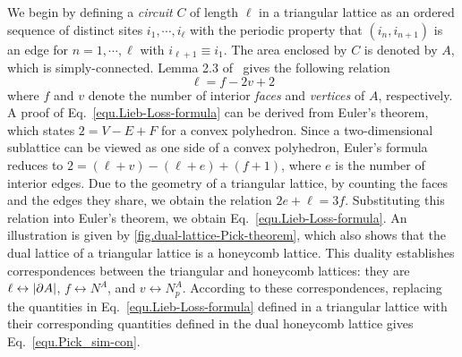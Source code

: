 We begin by defining a \textit{circuit} $C$ of length $\ell$ in a triangular lattice as an ordered sequence of distinct sites $i_1,\cdots, i_\ell$ with the periodic property that $(i_n, i_{n+1})$ is an edge for $n = 1, \cdots, \ell$ with $i_{\ell+1} \equiv i_1$. The area enclosed by $C$ is denoted by $A$, which is simply-connected. Lemma 2.3 of~\cite{Lieb-Loss_1992} gives the following relation
\begin{equation}\label{equ.Lieb-Loss-formula}
    \ell = f - 2v + 2
\end{equation}
where $f$ and $v$ denote the number of interior \textit{faces} and \textit{vertices} of $A$, respectively. A proof of Eq.~\eqref{equ.Lieb-Loss-formula} can be derived from Euler's theorem, which states $2 = V-E+F$ for a convex polyhedron. Since a two-dimensional sublattice can be viewed as one side of a convex polyhedron, Euler's formula reduces to $2 = (\ell + v) - (\ell + e) + (f+1)$, where $e$ is the number of interior edges. Due to the geometry of a triangular lattice, by counting the faces and the edges they share, we obtain the relation $2e+\ell = 3f$. Substituting this relation into Euler's theorem, we obtain Eq.~\eqref{equ.Lieb-Loss-formula}. An illustration is given by \autoref{fig.dual-lattice-Pick-theorem}, which also shows that the dual lattice of a triangular lattice is a honeycomb lattice. This duality establishes correspondences between the triangular and honeycomb lattices: they are $\ell\leftrightarrow\abs{\partial A}$, $f\leftrightarrow N^A$, and $v\leftrightarrow N^A_p$. According to these correspondences, replacing the quantities in Eq.~\eqref{equ.Lieb-Loss-formula} defined in a triangular lattice with their corresponding quantities defined in the dual honeycomb lattice gives Eq.~\eqref{equ.Pick_sim-con}.



